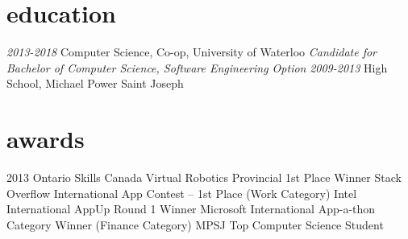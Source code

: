 \documentclass[]{friggeri-cv}
\begin{document}
\section{education}

\begin{entrylist}
  \entry
    {\emph{2013-2018}}
    {Computer Science, Co-op, University of Waterloo}
    { }
    {\emph{Candidate for Bachelor of Computer Science, Software Engineering Option}}
  \entry
    {\emph{2009-2013}}
    {High School, Michael Power Saint Joseph}
    {}
    {}
\end{entrylist}

\section{awards}
	2013 Ontario Skills Canada Virtual Robotics Provincial 1st Place Winner  Stack Overflow International App Contest – 1st Place (Work Category)  Intel International AppUp Round 1 Winner  Microsoft International App-a-thon Category Winner (Finance Category)  MPSJ Top Computer Science Student
\end{document}
